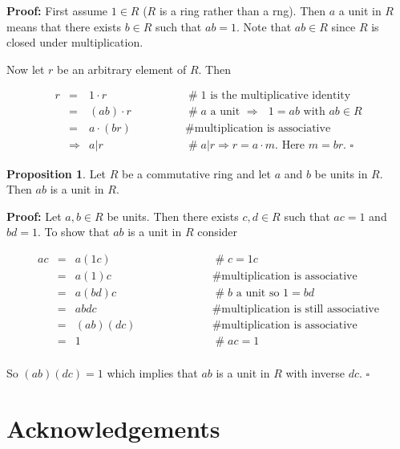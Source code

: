 \documentclass[11pt, oneside]{article}   	%
\theoremstyle{definition}
\newtheorem{proposition}{Proposition}[section]
\begin{document}
\noindent 
\textbf{Proof:} First assume $1 \in R$ ($R$ is a ring rather than a rng). Then $a$ a unit in $R$ means that there exists $b \in R$ such
that $ab = 1$. Note that $ab \in R$ since $R$ is closed under multiplication. 

\bigskip
\noindent
Now let $r$ be an arbitrary element of $R$. Then 

\begin{equation*}
\begin{array}{rlll} 
r
&=&  1 \cdot r                         &\qquad\qquad\mathrel{\#} \text{$1$ is the multiplicative identity}\\
&=& (ab) \cdot r                      &\qquad\qquad\mathrel{\#} \text{$a$ a unit $\Rightarrow$ $1 = ab$ with $ab \in R$}           \\
&=& a \cdot (br)                      &\qquad\qquad\mathrel{\#} \text{multiplication is associative}       \\
&\Rightarrow& a|r                   &\qquad\qquad\mathrel{\#}\text{$a|r \Rightarrow r = a \cdot m$. Here  $m = br$. $\square$}
\end{array}
\end{equation*}

\bigskip


\begin{proposition}
Let $R$ be a commutative ring and let $a$ and $b$ be units in $R$. Then $ab$ is a unit in $R$.
\end{proposition}

\noindent
\textbf{Proof:}  Let $a, b \in R$ be units. Then  there exists $c, d \in R$ such that $ac = 1$ and
$bd = 1$. To show that $ab$ is a unit in $R$ consider 


\begin{equation*}
\begin{array}{rlll} 
ac
&=&  a(1c)                 &\qquad\qquad\qquad \mathrel{\#} c = 1 c            \\
&=&  a(1)c                 &\qquad\qquad\qquad \mathrel{\#} \text{multiplication is associative} \\
&=&  a(bd)c               &\qquad\qquad\qquad \mathrel{\#} \text{$b$ a unit so $1 = bd$} \\
&=&  abdc                 &\qquad\qquad\qquad \mathrel{\#} \text{multiplication is still associative}       \\
&=&  (ab)(dc)            &\qquad\qquad\qquad \mathrel{\#} \text{multiplication is associative}       \\
&=&  1                      &\qquad\qquad\qquad \mathrel{\#} ac = 1      \\
\end{array}
\end{equation*}

\bigskip
\noindent
So $(ab)(dc) = 1$ which implies that $ab$ is a unit in $R$ with inverse $dc$. $\square$


\newpage
\section{Acknowledgements}



\end{document}
